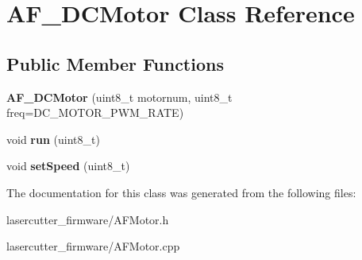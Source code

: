 \hypertarget{class_a_f___d_c_motor}{}\section{A\+F\+\_\+\+D\+C\+Motor Class Reference}
\label{class_a_f___d_c_motor}
\subsection*{Public Member Functions}
\begin{DoxyCompactItemize}
\item 
{\bfseries A\+F\+\_\+\+D\+C\+Motor} (uint8\+\_\+t motornum, uint8\+\_\+t freq=D\+C\+\_\+\+M\+O\+T\+O\+R\+\_\+\+P\+W\+M\+\_\+\+R\+A\+TE)\hypertarget{class_a_f___d_c_motor_a2d56375a5017d97aab027131c9da1160}{}\label{class_a_f___d_c_motor_a2d56375a5017d97aab027131c9da1160}

\item 
void {\bfseries run} (uint8\+\_\+t)\hypertarget{class_a_f___d_c_motor_aadb632824a197a86a8264b337c3c3110}{}\label{class_a_f___d_c_motor_aadb632824a197a86a8264b337c3c3110}

\item 
void {\bfseries set\+Speed} (uint8\+\_\+t)\hypertarget{class_a_f___d_c_motor_a655aa89c20d3391809d3616914ce6532}{}\label{class_a_f___d_c_motor_a655aa89c20d3391809d3616914ce6532}

\end{DoxyCompactItemize}


The documentation for this class was generated from the following files\+:\begin{DoxyCompactItemize}
\item 
lasercutter\+\_\+firmware/A\+F\+Motor.\+h\item 
lasercutter\+\_\+firmware/A\+F\+Motor.\+cpp\end{DoxyCompactItemize}
